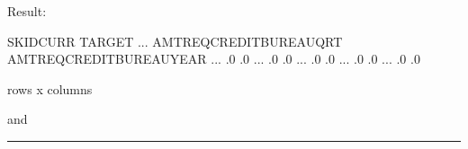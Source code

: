 \documentclass[letterpaper,11pt,english]{sphinxmanual}
\begin{document}
Result:

\begin{sphinxVerbatim}[commandchars=\\\{\}]
   SK\PYGZus{}ID\PYGZus{}CURR  TARGET  ... AMT\PYGZus{}REQ\PYGZus{}CREDIT\PYGZus{}BUREAU\PYGZus{}QRT AMT\PYGZus{}REQ\PYGZus{}CREDIT\PYGZus{}BUREAU\PYGZus{}YEAR
               ...                       .0                        .0
               ...                       .0                        .0
               ...                       .0                        .0
               ...                       .0                        .0
               ...                       .0                        .0

\PYG{o}{[} rows x  columns\PYG{o}{]}
\end{sphinxVerbatim}

and
\begin{quote}

\begin{figure}[htbp]
\centering

\noindent{}
\end{figure}

\begin{figure}[htbp]
\centering

\noindent{}
\end{figure}
\end{quote}


\bigskip\hrule\bigskip
\end{document}
